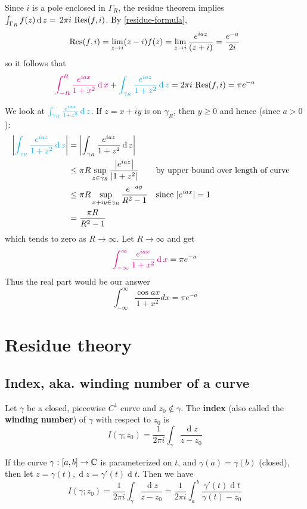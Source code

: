\documentclass[12pt]{article}
\renewcommand{\d}{\ensuremath{\operatorname{d}}}
\begin{document}
Since $i$ is a pole enclosed in $\Gamma_R$, the residue theorem implies \(\int_{\Gamma_{R}}f(z)\d z=\,2\pi i\,\Res (f,i)\). By \cref{residue-formula}, \[\operatorname{Res} (f,i)=\operatorname*{lim}_{z\rightarrow i}(z-i)f(z)=\operatorname*{lim}_{z\rightarrow i}\frac{e^{i a z}}{(z+i)}=\frac{e^{-a}}{2i}\] so it follows that 
\[\rt{\int_{-R}^{R}{\frac{e^{i a x}}{1+x^{2}}}\d x}+\bt{\int_{\gamma_{R}}{\frac{e^{i a z}}{1+z^{2}}}\d z}=2\pi i\,\Res (f,i)=\pi e^{-a}\]

We look at $\bt{\int_{\gamma_{R}}{\frac{e^{i a z}}{1+z^{2}}}\d z}$. If $z=x+i y$ is on $\gamma_R$, then $y \geq 0$ and hence (since $a>0$):
\[\begin{aligned}
    \left|\bt{\int_{\gamma_{R}}{\frac{e^{i a z}}{1+z^{2}}}\d z}\right| & =\left|\int_{\gamma_R} \frac{e^{i a z}}{1+z^2} \d z\right| \\
    & \leq \pi R \sup _{z \in \gamma_R} \frac{\left|e^{i a z}\right|}{\left|1+z^2\right|} &&\text{by upper bound over length of curve}\\
    & \leq \pi R \sup _{x+i y \in \gamma_R} \frac{e^{-a y}}{R^2-1} &&\text{since }|e^{iax}|=1\\
    & =\frac{\pi R}{R^2-1}
    \end{aligned}\]
which tends to zero as $R \rightarrow \infty$.
Let $R \rightarrow \infty$ and get \[\rt{\int_{-\infty}^{\infty} \frac{e^{i a x}}{1+x^2} \d x}=\pi e^{-a}\] Thus the real part would be our answer \[\int_{-\infty}^{\infty} \frac{\cos a x}{1+x^2} d x=\pi e^{-a}\]

\section{Residue theory}
\subsection{Index, aka. winding number of a curve}
 Let $\gamma$ be a closed, piecewise $C^1$ curve and $z_0\notin \gamma$. The \textbf{index} (also called the \textbf{winding number}) of $\gamma$ with respect to $z_0$ is \[I(\gamma;z_0)=\frac{1}{2\pi i}\int_{\gamma}\frac{\d z}{z-z_0}\]

\rmk If the curve $\gamma:[a,b]\to \mathbb{C}$ is parameterized on $t$, and $\gamma(a)=\gamma(b)$ (closed), then let $z=\gamma(t), \d z=\gamma'(t)\d t$. Then we have \[I(\gamma;z_0)=\frac{1}{2\pi i}\int_{\gamma}\frac{\d z}{z-z_0} = \frac{1}{2\pi i}\int_{a}^{b}\frac{\gamma'(t)\d t}{\gamma(t)-z_0}\]
\end{document}
